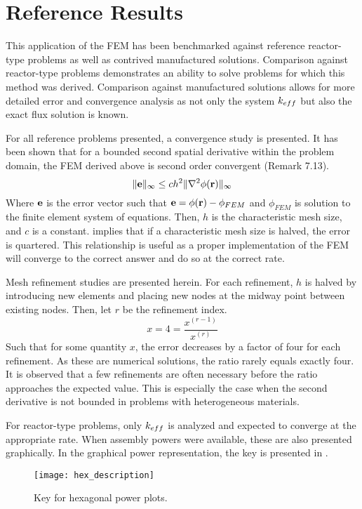 \section{Reference Results}
  This application of the FEM has been benchmarked against reference 
  reactor-type problems as well as contrived manufactured solutions. Comparison
  against reactor-type problems demonstrates an ability to solve problems for
  which this method was derived. Comparison against manufactured solutions 
  allows for more detailed error and convergence analysis as not only the system
  $k_{eff}$ but also the exact flux solution is known.
  
  For all reference problems presented, a convergence study is presented. It has 
  been shown that for a bounded second spatial derivative within the problem 
  domain, the FEM derived above is second order convergent \cite{textbookli} 
  (Remark 7.13).
  \begin{equation} \label{eq:error_bound}
    \|\mathbf{e}\|_{\infty} \le c h^2 \| \mathbf{\nabla}^2 \phi(\mathbf{r}) \|_{\infty}
  \end{equation}
  Where $\mathbf{e}$ is the error vector such that $\mathbf{e} = \phi(\mathbf{r}) - \phi_{FEM}$ and
  $\phi_{FEM}$ is solution to the finite element system of equations. Then,
  $h$ is the characteristic mesh size, and $c$ is a constant. 
   implies that if a characteristic mesh size is halved, 
  the error is quartered. This relationship is useful as a proper implementation 
  of the FEM will converge to the correct answer and do so at the correct rate.
  
  Mesh refinement studies are presented herein. For each refinement, $h$ is 
  halved by introducing new elements and placing new nodes at the midway point
  between existing nodes. Then, let $r$ be the refinement index.
  \begin{equation}
    x = 4 = \frac{x^{(r-1)}}{x^{(r)}}
  \end{equation}
  Such that for some quantity $x$, the error decreases by a factor of four for 
  each refinement. As these are numerical solutions, the ratio rarely equals 
  exactly four. It is observed that a few refinements are often necessary 
  before the ratio approaches the expected value. This is especially the case
  when the second derivative is not bounded in problems with heterogeneous 
  materials.
  
  For reactor-type problems, only $k_{eff}$ is analyzed and expected to converge
  at the appropriate rate. When assembly powers were available, these are also
  presented graphically. In the graphical power representation, the key is 
  presented in .
  \begin{figure}
    \centering
    \texttt{[image: hex\_description]}
    \caption{Key for hexagonal power plots.}
    \label{fig:hex_description}
  \end{figure}
  
